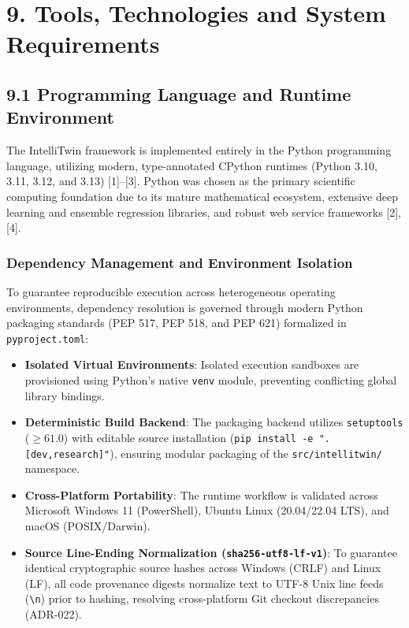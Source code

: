\documentclass[12pt,a4paper]{article}
\begin{document}
\section*{9. Tools, Technologies and System Requirements}

\subsection*{9.1 Programming Language and Runtime Environment}
The IntelliTwin framework is implemented entirely in the Python programming language, utilizing modern, type-annotated CPython runtimes (Python 3.10, 3.11, 3.12, and 3.13) [1]--[3]. Python was chosen as the primary scientific computing foundation due to its mature mathematical ecosystem, extensive deep learning and ensemble regression libraries, and robust web service frameworks [2], [4].

\subsubsection*{Dependency Management and Environment Isolation}
To guarantee reproducible execution across heterogeneous operating environments, dependency resolution is governed through modern Python packaging standards (PEP 517, PEP 518, and PEP 621) formalized in \texttt{pyproject.toml}:
\begin{itemize}
    \item \textbf{Isolated Virtual Environments}: Isolated execution sandboxes are provisioned using Python's native \texttt{venv} module, preventing conflicting global library bindings.
    \item \textbf{Deterministic Build Backend}: The packaging backend utilizes \texttt{setuptools} ($\ge 61.0$) with editable source installation (\texttt{pip install -e ".[dev,research]"}), ensuring modular packaging of the \texttt{src/intellitwin/} namespace.
    \item \textbf{Cross-Platform Portability}: The runtime workflow is validated across Microsoft Windows 11 (PowerShell), Ubuntu Linux (20.04/22.04 LTS), and macOS (POSIX/Darwin).
    \item \textbf{Source Line-Ending Normalization (\texttt{sha256-utf8-lf-v1})}: To guarantee identical cryptographic source hashes across Windows (CRLF) and Linux (LF), all code provenance digests normalize text to UTF-8 Unix line feeds (\texttt{\textbackslash n}) prior to hashing, resolving cross-platform Git checkout discrepancies (ADR-022).
\end{itemize}
\end{document}
